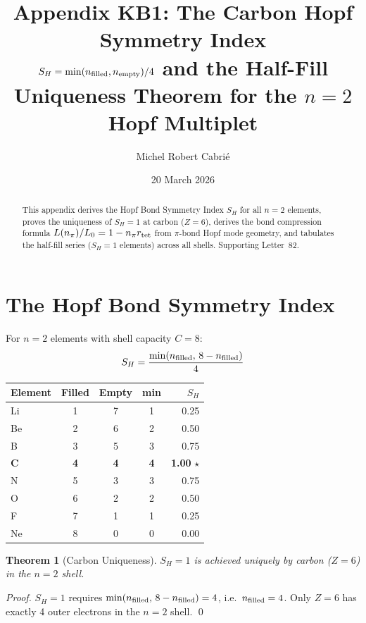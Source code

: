 \documentclass[aps,prl,twocolumn,showpacs,superscriptaddress]{revtex4-2}
\newtheorem{theorem}{Theorem}
\begin{document}
\title{Appendix KB1: The Carbon Hopf Symmetry Index\\
$S_H = \min(n_{\rm filled},n_{\rm empty})/4$ and the Half-Fill
Uniqueness Theorem for the $n=2$ Hopf Multiplet}

\author{Michel Robert Cabri\'e}
\date{20 March 2026}

\begin{abstract}
This appendix derives the Hopf Bond Symmetry Index $S_H$ for all 
$n=2$ elements, proves the uniqueness of $S_H=1$ at carbon ($Z=6$), 
derives the bond compression formula $L(n_\pi)/L_0 = 1-n_\pi r_{\rm tet}$ 
from $\pi$-bond Hopf mode geometry, and tabulates the half-fill 
series ($S_H=1$ elements) across all shells. Supporting Letter~82.
\end{abstract}

\maketitle

\section{The Hopf Bond Symmetry Index}

For $n=2$ elements with shell capacity $C=8$:
\begin{equation}
    S_H = \frac{\min(n_{\rm filled},\,8-n_{\rm filled})}{4}
\end{equation}

\begin{center}
\begin{tabular}{lcccr}
\toprule
Element & Filled & Empty & min & $S_H$ \\
\midrule
Li & 1 & 7 & 1 & 0.25 \\
Be & 2 & 6 & 2 & 0.50 \\
B  & 3 & 5 & 3 & 0.75 \\
\textbf{C}  & \textbf{4} & \textbf{4} & \textbf{4} & \textbf{1.00} $\star$ \\
N  & 5 & 3 & 3 & 0.75 \\
O  & 6 & 2 & 2 & 0.50 \\
F  & 7 & 1 & 1 & 0.25 \\
Ne & 8 & 0 & 0 & 0.00 \\
\bottomrule
\end{tabular}
\end{center}

\begin{theorem}[Carbon Uniqueness]
$S_H=1$ is achieved uniquely by carbon ($Z=6$) in the $n=2$ shell.
\end{theorem}
\begin{proof}
$S_H=1$ requires $\min(n_{\rm filled},\,8-n_{\rm filled})=4$, 
i.e.\ $n_{\rm filled}=4$. Only $Z=6$ has exactly 4 outer electrons 
in the $n=2$ shell. \qed
\end{proof}
\end{document}

